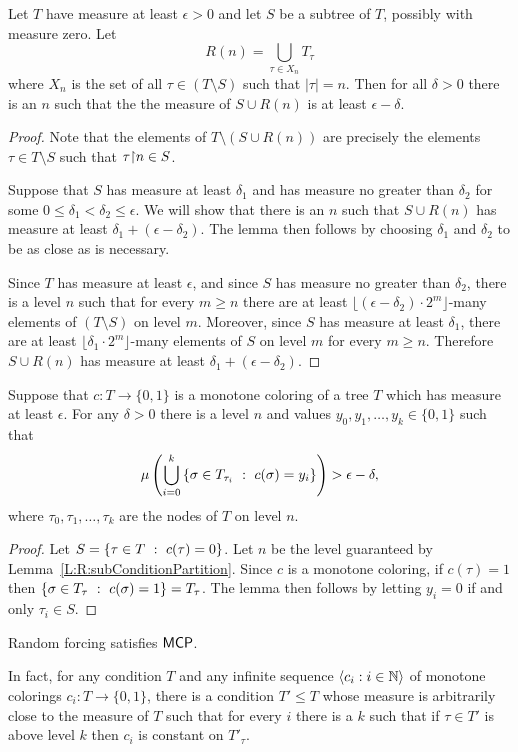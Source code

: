 \begin{lem}[\RCAo]\label{L:R:subConditionPartition}
Let $T$ have measure at least $\epsilon>0$ and
let $S$ be a subtree of $T$, possibly with measure zero.
Let $$R(n)=\bigcup_{\tau\in X_n}T_\tau$$
where $X_n$ is the set of all $\tau\in (T\setminus S)$ such that $|\tau|=n$.
Then for all $\delta>0$ there is an $n$ such that the
the measure of $S\cup R(n)$ is at least $\epsilon-\delta$.
\end{lem}
\begin{proof}
Note that the elements of $T\setminus(S\cup R(n))$ are precisely
the elements $\tau\in T\setminus S$ such that $\tau{\upharpoonright} n\in S$.

Suppose that $S$ has measure at least $\delta_1$ and has
measure no greater than $\delta_2$ for some
$0\leq \delta_1<\delta_2\leq \epsilon$.
We will show that there is an $n$ such that
$S\cup R(n)$ has measure at least $\delta_1+(\epsilon-\delta_2)$.
The lemma then follows by choosing $\delta_1$ and $\delta_2$
to be as close as is necessary.

Since $T$ has measure at least $\epsilon$,
and since $S$ has measure no greater than $\delta_2$,
there is a level $n$ such that for every $m\geq n$
there are at least $\lfloor(\epsilon-\delta_2)\cdot 2^m\rfloor$-many
elements of $(T\setminus S)$ on level $m$.
Moreover, since $S$ has measure at least $\delta_1$,
there are at least $\lfloor\delta_1\cdot 2^m\rfloor$-many
elements of $S$ on level $m$ for every $m\geq n$.
Therefore $S\cup R(n)$ has measure at least $\delta_1+(\epsilon-\delta_2)$.
\end{proof}

\begin{lem}[\RCAo]\label{L:R:preMCP}
Suppose that $c:T\to\{0,1\}$ is a monotone coloring
of a tree $T$ which has measure at least $\epsilon$.
For any $\delta>0$ there is a level $n$ and values
$y_0,y_1,\ldots,y_k\in\{0,1\}$ such that
$$\mu\left(\bigcup_{i=0}^k\left\{\sigma\in T_{\tau_i}\ :\ c(\sigma)=y_i\right\}\right)>\epsilon-\delta,$$
where $\tau_0,\tau_1,\ldots,\tau_k$ are the nodes of $T$ on level $n$.
\end{lem}
\begin{proof}
Let $S=\left\{\tau\in T\ :\ c(\tau)=0\right\}$.
Let $n$ be the level guaranteed by Lemma~\ref{L:R:subConditionPartition}.
Since $c$ is a monotone coloring, if $c(\tau)=1$ then
$\left\{\sigma\in T_\tau\ :\ c(\sigma)=1\right\}=T_\tau$.
The lemma then follows by letting $y_i=0$ if and only $\tau_i\in S$.
\end{proof}


\begin{prop}[\ACAo]\label{P:R:MCP}
Random forcing satisfies $\mathsf{MCP}$.

In fact, for any condition $T$ and any infinite sequence $\langle c_i:i\in\mathbb{N}\rangle$ of monotone
colorings $c_i:T\rightarrow \{0,1\}$, there is a condition $T'\leq T$
whose measure is arbitrarily close to the measure of $T$ such that
for every $i$ there is a $k$ such that if $\tau\in T'$ is above level $k$
then $c_i$ is constant on $T'_\tau$.
\end{prop}

